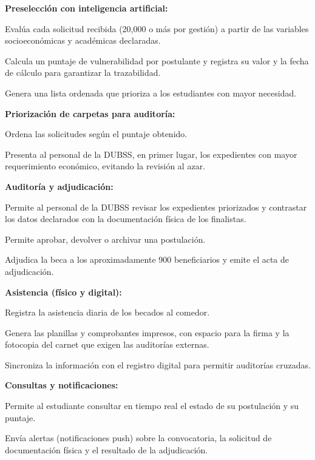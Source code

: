 \noindent\textbf{Preselección con inteligencia artificial:}
\begin{incisos}
    \item Evalúa cada solicitud recibida (20,000 o más por gestión) a partir de las variables socioeconómicas y académicas declaradas.
    \item Calcula un puntaje de vulnerabilidad por postulante y registra su valor y la fecha de cálculo para garantizar la trazabilidad.
    \item Genera una lista ordenada que prioriza a los estudiantes con mayor necesidad.
\end{incisos}

\noindent\textbf{Priorización de carpetas para auditoría:}
\begin{incisos}
    \item Ordena las solicitudes según el puntaje obtenido.
    \item Presenta al personal de la DUBSS, en primer lugar, los expedientes con mayor requerimiento económico, evitando la revisión al azar.
\end{incisos}

\noindent\textbf{Auditoría y adjudicación:}
\begin{incisos}
    \item Permite al personal de la DUBSS revisar los expedientes priorizados y contrastar los datos declarados con la documentación física de los finalistas.
    \item Permite aprobar, devolver o archivar una postulación.
    \item Adjudica la beca a los aproximadamente 900 beneficiarios y emite el acta de adjudicación.
\end{incisos}

\noindent\textbf{Asistencia (físico y digital):}
\begin{incisos}
    \item Registra la asistencia diaria de los becados al comedor.
    \item Genera las planillas y comprobantes impresos, con espacio para la firma y la fotocopia del carnet que exigen las auditorías externas.
    \item Sincroniza la información con el registro digital para permitir auditorías cruzadas.
\end{incisos}

\noindent\textbf{Consultas y notificaciones:}
\begin{incisos}
    \item Permite al estudiante consultar en tiempo real el estado de su postulación y su puntaje.
    \item Envía alertas (notificaciones push) sobre la convocatoria, la solicitud de documentación física y el resultado de la adjudicación.
\end{incisos}

